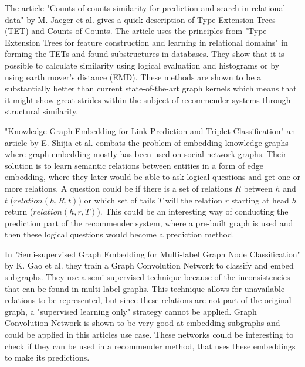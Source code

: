 The article "Counts-of-counts similarity for prediction and search in relational data" by M. Jaeger et al.\cite{jaeger2019counts} gives a quick description of Type Extension Trees (TET) and Counts-of-Counts. 
The article uses the principles from "Type Extension Trees for feature construction and learning in relational domains" in forming the TETs and found substructures in databases. 
They show that it is possible to calculate similarity using logical evaluation and histograms or by using earth mover's distance (EMD). 
These methods are shown to be a substantially better than current state-of-the-art graph kernels which means that it might show great strides within the subject of recommender systems through structural similarity.

"Knowledge Graph Embedding for Link Prediction and Triplet Classification" an article by E. Shijia et al. \cite{10.1007/978-981-10-3168-7_23} combats the problem of embedding knowledge graphs where graph embedding mostly has been used on social network graphs. 
Their solution is to learn semantic relations between entities in a form of edge embedding, where they later would be able to ask logical questions and get one or more relations. 
A question could be if there is a set of relations $R$ between $h$ and $t$ ($relation(h,R,t)$) or which set of tails $T$ will the relation $r$ starting at head $h$ return ($relation(h,r,T)$). 
This could be an interesting way of conducting the prediction part of the recommender system, where a pre-built graph is used and then these logical questions would become a prediction method.

In "Semi-supervised Graph Embedding for Multi-label Graph Node Classification" by K. Gao et al.\cite{10.1007/978-3-030-34223-4_35} they train a Graph Convolution Network to classify and embed subgraphs. 
They use a semi supervised technique because of the inconsistencies that can be found in multi-label graphs. 
This technique allows for unavailable relations to be represented, but since these relations are not part of the original graph, a "supervised learning only" strategy cannot be applied. 
Graph Convolution Network is shown to be very good at embedding subgraphs and could be applied in this articles use case.
These networks could be interesting to check if they can be used in a recommender method, that uses these embeddings to make its predictions.
